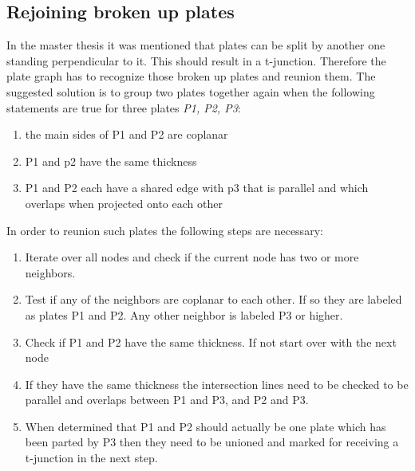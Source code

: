 \documentclass[../ClassicThesis.tex]{subfiles}
\begin{document}
\subsection{Rejoining broken up plates}
In the master thesis \cite{master-thesis} it was mentioned that plates can be split by another one standing perpendicular to it. This should result in a t-junction. Therefore the plate graph has to recognize those broken up plates and reunion them. The suggested solution is to group two plates together again when the following statements are true for three plates \emph{P1, P2, P3}:\\
    \begin{enumerate}
        \item the main sides of P1 and P2 are coplanar
        \item P1 and p2 have the same thickness
        \item P1 and P2 each have a shared edge with p3 that is parallel and which overlaps when projected onto each other
    \end{enumerate}
    In order to reunion such plates the following steps are necessary:
    \begin{enumerate}
        \item Iterate over all nodes and check if the current node has two or more neighbors. 
        \item Test if any of the neighbors are coplanar to each other. If so they are labeled as plates P1 and P2. Any other neighbor is labeled P3 or higher.
        \item Check if P1 and P2 have the same thickness. If not start over with the next node
        \item If they have the same thickness the intersection lines need to be checked to be parallel and overlaps between P1 and P3, and P2 and P3.
        \item When determined that P1 and P2 should actually be one plate which has been parted by P3 then they need to be unioned and marked for receiving a t-junction in the next step.
    \end{enumerate}
\end{document}

